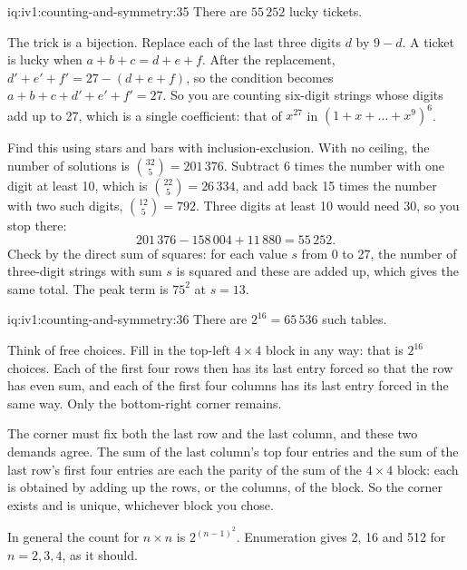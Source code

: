 \enlargethispage{-3\baselineskip}%
\begin{solution}{iq:iv1:counting-and-symmetry:35}
There are $55\,252$ lucky tickets.

The trick is a bijection. Replace each of the last three digits $d$ by $9 - d$. A ticket is lucky when $a + b + c = d + e + f$. After the replacement, $d' + e' + f' = 27 - (d + e + f)$, so the condition becomes $a + b + c + d' + e' + f' = 27$. So you are counting six-digit strings whose digits add up to 27, which is a single coefficient: that of $x^{27}$ in $(1 + x + \dots + x^9)^6$.

Find this using stars and bars with inclusion-exclusion. With no ceiling, the number of solutions is $\binom{32}{5} = 201\,376$. Subtract 6 times the number with one digit at least 10, which is $\binom{22}{5} = 26\,334$, and add back 15 times the number with two such digits, $\binom{12}{5} = 792$. Three digits at least 10 would need 30, so you stop there:
\[
201\,376 - 158\,004 + 11\,880 = 55\,252.
\]
Check by the direct sum of squares: for each value $s$ from 0 to 27, the number of three-digit strings with sum $s$ is squared and these are added up, which gives the same total. The peak term is $75^2$ at $s = 13$.

\end{solution}

\begin{solution}{iq:iv1:counting-and-symmetry:36}
There are $2^{16} = 65\,536$ such tables.

Think of free choices. Fill in the top-left $4 \times 4$ block in any way: that is $2^{16}$ choices. Each of the first four rows then has its last entry forced so that the row has even sum, and each of the first four columns has its last entry forced in the same way. Only the bottom-right corner remains.

The corner must fix both the last row and the last column, and these two demands agree. The sum of the last column's top four entries and the sum of the last row's first four entries are each the parity of the sum of the $4 \times 4$ block: each is obtained by adding up the rows, or the columns, of the block. So the corner exists and is unique, whichever block you chose.

In general the count for $n \times n$ is $2^{(n-1)^2}$. Enumeration gives 2, 16 and 512 for $n = 2, 3, 4$, as it should.

\end{solution}

